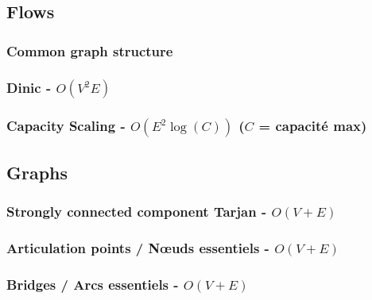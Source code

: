 \documentclass[landscape,a4paper,twocolumn,10pt]{report}
\begin{document}
\subsection*{Flows}
\label{flows}

\subsubsection{Common graph structure}


\subsubsection{Dinic - $O(V^2 E)$}


\subsubsection{Capacity Scaling - $O(E^2 \log(C))$ ($C$ = capacité max)}




\subsection*{Graphs}
\label{graphs}

\subsubsection{Strongly connected component Tarjan - $O(V + E)$}


%

\subsubsection{Articulation points / N\oe uds essentiels - $O(V + E)$}


\subsubsection{Bridges / Arcs essentiels - $O(V + E)$}

\end{document}
